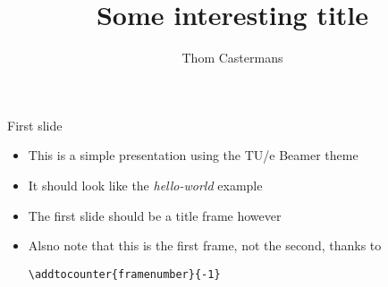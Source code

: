 \documentclass[12pt, aspectratio=169]{beamer} %
\title{Some interesting title}
\author{Thom Castermans}
\begin{document}
\begin{titleframe}
\end{titleframe}
\addtocounter{framenumber}{-1}

\begin{frame}{First slide}
  \begin{itemize}
    \item This is a simple presentation using the TU/e Beamer theme
    \item It should look like the \textit{hello-world} example
    \item The first slide should be a title frame however
    \item Alsno note that this is the first frame, not the second, thanks to

        \texttt{\textbackslash{}addtocounter\{framenumber\}\{-1\}}
  \end{itemize}
\end{frame}
\end{document}
